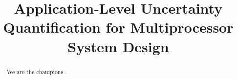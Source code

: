 \documentclass{sig-alternate}
\begin{document}
  \title{Application-Level Uncertainty Quantification for Multiprocessor System Design}

  \maketitle

  \begin{abstract}
    We are the champions \cite{ukhov2012, ukhov2013}.
  \end{abstract}

  \printbibliography
\end{document}
